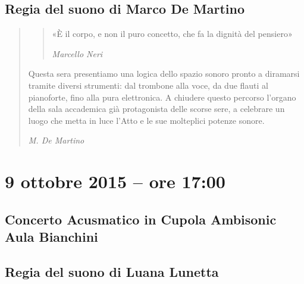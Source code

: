 \documentclass[8pt, twoside, a5paper]{extreport}
\begin{document}
{\fontsize{30}{30} }

\subsection*{\textsf{Regia del suono di Marco De Martino}}

\begin{quote}

{\svolk \small
\begin{quote}«È il corpo, e non il puro concetto, che fa la dignità del pensiero»

\hspace{1mm}\emph{Marcello Neri}
\end{quote}

Questa sera presentiamo una logica dello spazio sonoro pronto a diramarsi tramite diversi strumenti: dal trombone alla voce, da due flauti al pianoforte, fino alla pura elettronica. A chiudere questo percorso l'organo della sala accademica già protagonista delle scorse sere, a celebrare un luogo che metta in luce l'Atto e le sue molteplici potenze sonore.}

\emph{M. De Martino}
\end{quote}    


\smallskip

\begin{multicols}{2}




\end{multicols}

\clearpage


\section*{9 ottobre 2015 -- ore 17:00}

\subsection*{{\small Concerto Acusmatico in Cupola Ambisonic} \\
	\textsf{Aula Bianchini}}

{\fontsize{30}{30} }

\subsection*{\textsf{Regia del suono di Luana Lunetta}}
\end{document}
